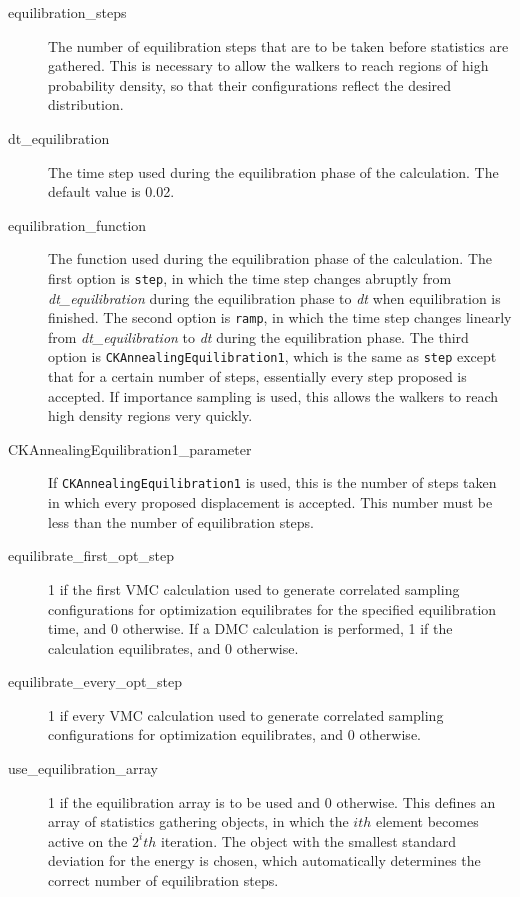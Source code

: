 \documentclass{article}
\begin{document}
\begin{description}

\item [equilibration\_steps]  The number of equilibration steps that are
  to be taken before statistics are gathered.  This is necessary to
  allow the walkers to reach regions of high probability density, so
  that their configurations reflect the desired distribution.  

\item [dt\_equilibration]  The time step used during the equilibration
  phase of the calculation.  The default value is 0.02.  

\item [equilibration\_function]  The function used during the
  equilibration phase of the calculation.  The first option is 
  \verb-step-, in which the time step changes abruptly from
  \emph{dt\_equilibration} during the equilibration phase to \emph{dt}
  when equilibration is finished.  The second option is \verb-ramp-,
  in which the time step changes linearly from \emph{dt\_equilibration}
  to \emph{dt} during the equilibration phase.  The third option is
  \verb-CKAnnealingEquilibration1-, which is the same as \verb-step-
  except that for a certain number of steps, essentially every step
  proposed is accepted.  If importance sampling is used, this allows
  the walkers to reach high density regions very quickly.

\item [CKAnnealingEquilibration1\_parameter]  If
  \verb-CKAnnealingEquilibration1- is used, this is the number of
  steps taken in which every proposed displacement is accepted.  This
  number must be less than the number of equilibration steps.  
 
\item [equilibrate\_first\_opt\_step] 1 if the first VMC calculation used
  to generate correlated sampling configurations for optimization
  equilibrates for the specified equilibration time, and 0 otherwise.
  If a DMC calculation is performed, 1 if the calculation
  equilibrates, and 0 otherwise.   

\item [equilibrate\_every\_opt\_step] 1 if every VMC calculation used to
  generate correlated sampling configurations for optimization
  equilibrates, and 0 otherwise.  

\item [use\_equilibration\_array] 1 if the equilibration array is to be
  used and 0 otherwise.  This defines an array of statistics gathering
  objects, in which the $ith$ element becomes active on the $2^{i}th$
  iteration.  The object with the smallest standard deviation for the
  energy is chosen, which automatically determines the correct number
  of equilibration steps.  

\end{description}
\end{document}
